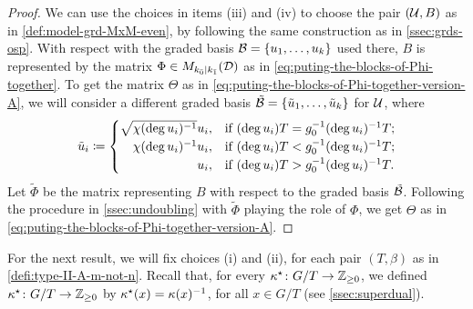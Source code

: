 \begin{proof}
    We can use the choices in items (iii) and (iv) to choose the pair $(\mathcal U, B)$ as in \cref{def:model-grd-MxM-even}, by following the same construction as in \cref{ssec:grds-osp}. 
    With respect with the graded basis $\mathcal B = \{ u_1, \ldots, u_k \}$ used there, $B$ is represented by the matrix $\Phi \in M_{k_{\bar{0}} | k_{\bar{1}}}(\mathcal{D})$ as in \cref{eq:puting-the-blocks-of-Phi-together}. 
    To get the matrix $\Theta$ as in \cref{eq:puting-the-blocks-of-Phi-together-version-A}, we will consider a different graded basis $\tilde {\mathcal B} = \{ \tilde u_1, \ldots, \tilde u_k \}$ for $\mathcal U$, where
    \[\label{eq:tilde-u_i-from-u_i}
        \tilde u_i \coloneqq 
        \begin{cases}
            \sqrt{\chi(\deg u_i)\inv} u_i, & \text{if }(\deg u_i) T = g_0\inv (\deg u_i)\inv T;\\
            \hfill \chi(\deg u_i)\inv u_i, & \text{if }(\deg u_i) T < g_0\inv (\deg u_i)\inv T;\\
            \hfill u_i, & \text{if }(\deg u_i) T > g_0\inv (\deg u_i)\inv T.
        \end{cases}
    \]
    Let $\tilde \Phi$ be the matrix representing $B$ with respect to the graded basis $\tilde {\mathcal B}$. 
    Following the procedure in \cref{ssec:undoubling} with $\tilde \Phi$ playing the role of $\Phi$, we get  $\Theta$ as in \cref{eq:puting-the-blocks-of-Phi-together-version-A}. 
\end{proof}

For the next result, we will fix choices (i) and (ii), for each pair $(T, \beta)$ as in \cref{defi:type-II-A-m-not-n}. 
Recall that, for every $\kappa^\star\colon G/T \to \mathbb{Z}_{\geq 0}$, we defined $\kappa^\star\colon G/T \to \mathbb{Z}_{\geq 0}$ by $\kappa^\star(x) = \kappa(x)^{-1}$, for all $x \in G/T$ (see \cref{ssec:superdual}).

